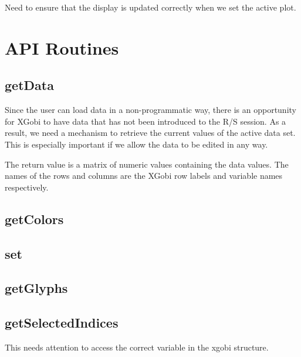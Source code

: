 {\red Need to ensure that the display is updated correctly when
we set the active plot.}


\section{}


\section{API Routines}

\subsection{getData}
Since the user can load data in a non-programmatic way, there is an
opportunity for XGobi to have data that has not been introduced to the
R/S session.  As a result, we need a mechanism to retrieve the current
values of the active data set.  This is especially important if we
allow the data to be edited in any way.

The return value is a matrix of numeric values containing the data
values.  The names of the rows and columns are the XGobi row labels
and variable names respectively.


\subsection{getColors}


\subsection{set}

\subsection{getGlyphs}


\subsection{getSelectedIndices}
This needs attention to access the correct
variable in the xgobi structure.
